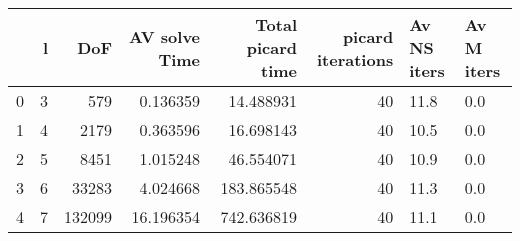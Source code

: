 \begin{tabular}{lrrrrrll}
\toprule
{} &  l &     DoF &  AV solve Time &  Total picard time &  picard iterations & Av NS iters & Av M iters \\
\midrule
0 &  3 &     579 &       0.136359 &          14.488931 &                 40 &        11.8 &        0.0 \\
1 &  4 &    2179 &       0.363596 &          16.698143 &                 40 &        10.5 &        0.0 \\
2 &  5 &    8451 &       1.015248 &          46.554071 &                 40 &        10.9 &        0.0 \\
3 &  6 &   33283 &       4.024668 &         183.865548 &                 40 &        11.3 &        0.0 \\
4 &  7 &  132099 &      16.196354 &         742.636819 &                 40 &        11.1 &        0.0 \\
\bottomrule
\end{tabular}
